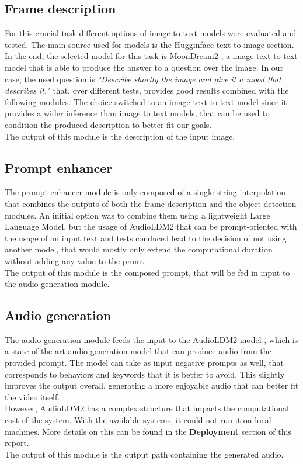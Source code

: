 \documentclass[conference]{IEEEtran}
\begin{document}
\subsection{Frame description}
For this crucial task different options of image to text models were evaluated and tested. The main source used for models is the Hugginface text-to-image section\cite{hfaceItt}.  
In the end, the selected model for this task is MoonDream2 \cite{moondream2}, a image-text to text model that is able to produce the answer to a question over the image.
In our case, the used question is \emph{"Describe shortly the image and give it a mood that describes it."} that, over different tests, provides good results combined with the following modules.
The choice switched to an image-text to text model since it provides a wider inference than image to text models, that can be used to condition the produced description to better fit our goals.\\
The output of this module is the description of the input image.

\subsection{Prompt enhancer}
The prompt enhancer module is only composed of a single string interpolation that combines the outputs of both the frame description and the object detection modules. An initial option was to combine them using a lightweight Large Language Model, but the usage of AudioLDM2 that can be prompt-oriented with the usage of an input text and tests conduced lead to the decision of not using another model, that would mostly only extend the computational duration without adding any value to the promt.\\
The output of this module is the composed prompt, that will be fed in input to the audio generation module. 

\subsection{Audio generation}
The audio generation module feeds the input to the AudioLDM2 model \cite{audioldm2}, which is a state-of-the-art audio generation model that can produce audio from the provided prompt. The model can take as input negative prompts as well, that corresponds to behaviors and keywords that it is better to avoid. 
This slightly improves the output overall, generating a more enjoyable audio that can better fit the video itself.\\
However, AudioLDM2 has a complex structure that impacts the computational cost of the system. With the available systems, it could not run it on local machines. More details on this can be found in the \textbf{Deployment} section of this report.\\
The output of this module is the output path containing the generated audio.
\end{document}
